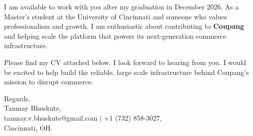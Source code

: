\documentclass[11pt]{letter}
\begin{document}
\begin{letter}{}
I am available to work with you after my graduation in December 2026. As a Master's student at the University of Cincinnati and someone who values professionalism and growth, I am enthusiastic about contributing to \textbf{Coupang} and helping scale the platform that powers its next-generation commerce infrastructure.

Please find my CV attached below. I look forward to hearing from you. I would be excited to help build the reliable, large scale infrastructure behind Coupang's mission to disrupt commerce.

{\setlength{\parskip}{0pt}
Regards,\\
Tanmay Bhuskute,\\
tanmay.v.bhuskute@gmail.com $\mid$ +1 (732) 858-3027,\\
Cincinnati, OH.
}

\end{letter}
\end{document}
